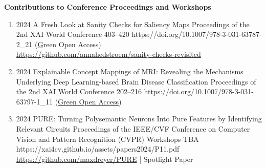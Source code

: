 \headedsection %
{\bf Contributions to Conference Proceedings and Workshops}{}
{
    \begin{enumerate}
        
        \item {}
                            {2024}
                            {A Fresh Look at Sanity Checks for Saliency Maps}
                            {Proceedings of the 2nd XAI World Conference}
                            {403--420}
                            {https://doi.org/10.1007/978-3-031-63787-2_21}
                            {(\href{https://arxiv.org/abs/2405.02383} Green Open Access)
                            \\\href{https://github.com/annahedstroem/sanity-checks-revisited}{https://github.com/annahedstroem/sanity-checks-revisited}}

        \item {}
                            {2024}
                            {Explainable Concept Mappings of MRI: Revealing the Mechanisms Underlying Deep Learning-based Brain Disease Classification}
                            {Proceedings of the 2nd XAI World Conference}
                            {202--216}
                            {https://doi.org/10.1007/978-3-031-63797-1_11}
                            {(\href{https://arxiv.org/abs/2404.10433}{Green Open Access})}


        \item {}
                            {2024}
                            {PURE: Turning Polysemantic Neurons Into Pure Features by Identifying Relevant Circuits}
                            {Proceedings of the IEEE/CVF Conference on Computer Vision and Pattern Recognition (CVPR) Workshops}
                            {TBA}
                            {https://xai4cv.github.io/assets/papers2024/P11.pdf}
                            {\\\href{https://github.com/maxdreyer/PURE}{https://github.com/maxdreyer/PURE} | 
                            Spotlight Paper}


\end{enumerate}}
